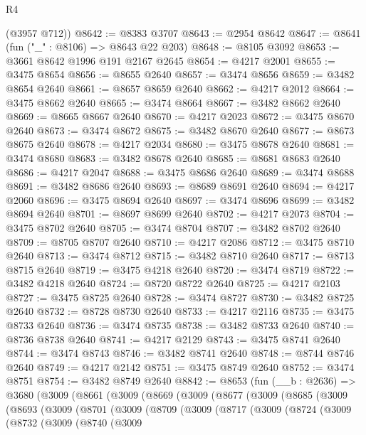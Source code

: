 \begin{lexlean}{R4}
\begin{coremodule}
      (@3957 @712))
@8642 := @8383 @3707
@8643 := @2954 @8642
@8647 := @8641 (fun ("_" : @8106) => @8643 @22 @203)
@8648 := @8105 @3092
@8653 := @3661 @8642 @1996 @191 @2167 @2645
@8654 := @4217 @2001
@8655 := @3475 @8654
@8656 := @8655 @2640
@8657 := @3474 @8656
@8659 := @3482 @8654 @2640
@8661 := @8657 @8659 @2640
@8662 := @4217 @2012
@8664 := @3475 @8662 @2640
@8665 := @3474 @8664
@8667 := @3482 @8662 @2640
@8669 := @8665 @8667 @2640
@8670 := @4217 @2023
@8672 := @3475 @8670 @2640
@8673 := @3474 @8672
@8675 := @3482 @8670 @2640
@8677 := @8673 @8675 @2640
@8678 := @4217 @2034
@8680 := @3475 @8678 @2640
@8681 := @3474 @8680
@8683 := @3482 @8678 @2640
@8685 := @8681 @8683 @2640
@8686 := @4217 @2047
@8688 := @3475 @8686 @2640
@8689 := @3474 @8688
@8691 := @3482 @8686 @2640
@8693 := @8689 @8691 @2640
@8694 := @4217 @2060
@8696 := @3475 @8694 @2640
@8697 := @3474 @8696
@8699 := @3482 @8694 @2640
@8701 := @8697 @8699 @2640
@8702 := @4217 @2073
@8704 := @3475 @8702 @2640
@8705 := @3474 @8704
@8707 := @3482 @8702 @2640
@8709 := @8705 @8707 @2640
@8710 := @4217 @2086
@8712 := @3475 @8710 @2640
@8713 := @3474 @8712
@8715 := @3482 @8710 @2640
@8717 := @8713 @8715 @2640
@8719 := @3475 @4218 @2640
@8720 := @3474 @8719
@8722 := @3482 @4218 @2640
@8724 := @8720 @8722 @2640
@8725 := @4217 @2103
@8727 := @3475 @8725 @2640
@8728 := @3474 @8727
@8730 := @3482 @8725 @2640
@8732 := @8728 @8730 @2640
@8733 := @4217 @2116
@8735 := @3475 @8733 @2640
@8736 := @3474 @8735
@8738 := @3482 @8733 @2640
@8740 := @8736 @8738 @2640
@8741 := @4217 @2129
@8743 := @3475 @8741 @2640
@8744 := @3474 @8743
@8746 := @3482 @8741 @2640
@8748 := @8744 @8746 @2640
@8749 := @4217 @2142
@8751 := @3475 @8749 @2640
@8752 := @3474 @8751
@8754 := @3482 @8749 @2640
@8842 := @8653
    (fun (__b : @2636) =>
    @3680
      (@3009
        (@8661
          (@3009
            (@8669
              (@3009
                (@8677
                  (@3009
                    (@8685
                      (@3009
                        (@8693
                          (@3009
                            (@8701
                              (@3009
                                (@8709
                                  (@3009
                                    (@8717
                                      (@3009
                                        (@8724
                                          (@3009
                                            (@8732
                                              (@3009
                                                (@8740
                                                  (@3009

\end{coremodule}
\end{lexlean}
